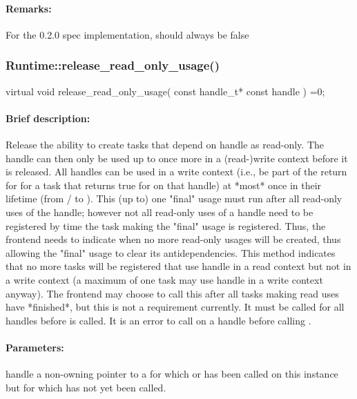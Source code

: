 \paragraph{Remarks:} For the 0.2.0 spec implementation,  should always be false


\subsubsection{Runtime::release\_read\_only\_usage()}
\begin{CppCode}
    virtual void
    release_read_only_usage(
      const handle_t* const handle
    ) =0;
\end{CppCode}

\paragraph{Brief description:} Release the ability to create tasks that depend on handle as read-only.  The handle can
     then only be used up to once more in a (read-)write context before it is released.
     All handles can be used in a write context (i.e., be part of the return for 
       for a task that returns true for  on that handle) at *most* once in their lifetime
       (from / to ).  This (up to) one "final"
       usage must run after all read-only uses of the handle; however not all read-only uses of
       a handle need to be registered by time the task making the "final" usage is registered.  Thus,
       the frontend needs to indicate when no more read-only usages will be created, thus allowing
       the "final" usage to clear its antidependencies.
       This method indicates that no more tasks will be registered that use handle in a read context
       but not in a write context (a maximum of one task may use handle in a write context anyway).
       The frontend may choose to call this after all tasks making read uses have *finished*, but this
       is not a requirement currently.  It must be called for all handles before  is
       called.  It is an error to call  on a handle before calling .
     
\paragraph{Parameters:}
\begin{compactdesc} 
\item[handle] a non-owning pointer to a  for which  or
      has been called on this instance but for which  has not
       yet been called.
\end{compactdesc}


